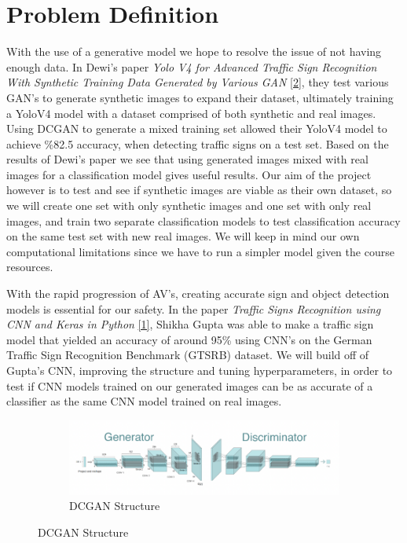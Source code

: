 \documentclass{article}
\begin{document}
\section{Problem Definition}

\qquad With the use of a generative model we hope to resolve the issue of not having enough data. In Dewi’s paper \textit{Yolo V4 for Advanced Traffic Sign Recognition With Synthetic Training Data Generated by Various GAN} \hyperref[Dewi]{[2]}, they test various GAN's to generate synthetic images to expand their dataset, ultimately training a YoloV4 model with a dataset comprised of both synthetic and real images. Using DCGAN to generate a mixed training set allowed their YoloV4 model to achieve \%82.5 accuracy, when detecting traffic signs on a test set. Based on the results of Dewi’s paper we see that using generated images mixed with real images for a classification model gives useful results. Our aim of the project however is to test and see if synthetic images are viable as their own dataset, so we will create one set with only synthetic images and one set with only real images, and train two separate classification models to test classification accuracy on the same test set with new real images. We will keep in mind our own computational limitations since we have to run a simpler model given the course resources.

\qquad With the rapid progression of AV's, creating accurate sign and object detection models is essential for our safety. In the paper \textit{Traffic Signs Recognition using CNN and Keras in Python} \hyperref[Gupta]{[1]}, Shikha Gupta was able to make a traffic sign model that yielded an accuracy of around 95\% using CNN's on the German Traffic Sign Recognition Benchmark (GTSRB) dataset. \@ We will build off of Gupta’s CNN, improving the structure and tuning hyperparameters, in order to test if CNN models trained on our generated images can be as accurate of a classifier as the same CNN model trained on real images.


\begin{figure}[h]
    \centering
    \begin{subfigure}{0.8\textwidth}
        \includegraphics[width=\linewidth]{Pictures/DCGAN.png}
        \caption{DCGAN Structure}
    \end{subfigure}
\end{figure}
\end{document}
